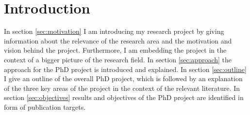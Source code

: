 \section*{Introduction}
%
In section \ref{sec:motivation} I am introducing my research project by giving information about the relevance of the research area and the motivation and vision behind the project. 
Furthermore, I am embedding the project in the context of a bigger picture of the research field. In section \ref{sec:approach} the approach for the PhD project is introduced and explained.
In section \ref{sec:outline} I give an outline of the overall PhD project, which is followed by an explanation of the three key areas of the project in the context of the 
relevant literature. In section \ref{sec:objectives} results and objectives of the PhD project are identified in form of publication targets. 


